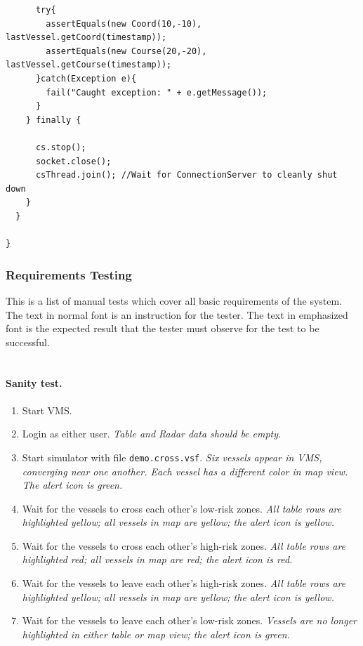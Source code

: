 \documentclass{article}
\begin{document}
\begin{verbatim}
      try{
        assertEquals(new Coord(10,-10), lastVessel.getCoord(timestamp));
        assertEquals(new Course(20,-20), lastVessel.getCourse(timestamp));
      }catch(Exception e){
        fail("Caught exception: " + e.getMessage());
      }
    } finally {

      cs.stop();
      socket.close();
      csThread.join(); //Wait for ConnectionServer to cleanly shut down
    }
  }

}
\end{verbatim}
\linespread{1.6}

\subsubsection{Requirements Testing}


This is a list of manual tests which cover all basic requirements of the system. The text in normal font is an instruction for the tester. The text in emphasized font is the expected result that the tester must observe for the test to be successful.

\paragraph{\\ Sanity test.}

\begin{enumerate}
\item Start VMS.
\item Login as either user. \emph{Table and Radar data should be empty.}
\item Start simulator with file \verb|demo.cross.vsf|. \emph{Six vessels appear in VMS, converging near one another. Each vessel has a different color in map view. The alert icon is green.}
\item Wait for the vessels to cross each other's low-risk zones. \emph{All table rows are highlighted yellow; all vessels in map are yellow; the alert icon is yellow.}
\item Wait for the vessels to cross each other's high-risk zones. \emph{All table rows are highlighted red; all vessels in map are red; the alert icon is red.}
\item Wait for the vessels to leave each other's high-risk zones. \emph{All table rows are highlighted yellow; all vessels in map are yellow; the alert icon is yellow.}
\item Wait for the vessels to leave each other's low-risk zones. \emph{Vessels are no longer highlighted in either table or map view; the alert icon is green.}
\end{enumerate}
\end{document}
